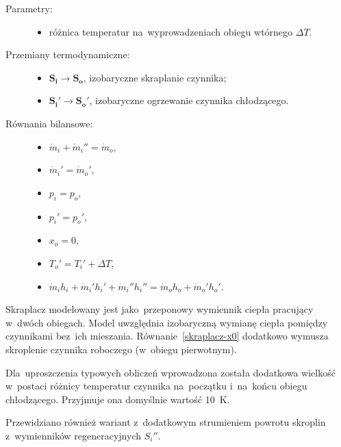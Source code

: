 \begin{description}

	\item[Parametry:] \hfill

		\begin{itemize}

			\item różnica temperatur na~wyprowadzeniach obiegu wtórnego
				$\Delta T$.

		\end{itemize}

	\item[Przemiany termodynamiczne:] \hfill

		\begin{itemize}

			\item $\mathbf{S_i} \rightarrow \mathbf{S_o}$,
				izobaryczne skraplanie czynnika;

			\item $\mathbf{S_i'} \rightarrow \mathbf{S_o'}$,
				izobaryczne ogrzewanie czynnika chłodzącego.

		\end{itemize}

	\item[Równania bilansowe:] \hfill

		\begin{itemize}

			\item \eq$\dot m_i + \dot m_i'' = \dot m_o$,

			\item \eq$\dot m_i' = \dot m_o'$,

			\item \eq$p_i = p_o$,

			\item \eq$p_i' = p_o'$,

			\item \eq$x_o = 0$,%
				\label{skraplacz-x0}

			\item \eq$T_o' = T_i' + \Delta T$,%
				\label{skraplacz-DT}

			\item \eq$\dot m_i h_i + \dot m_i' h_i' + \dot m_i'' h_i''
				= \dot m_o h_o + \dot m_o' h_o'$.

		\end{itemize}

\end{description}

Skraplacz modelowany jest jako~przeponowy wymiennik ciepła pracujący
w~dwóch obiegach. Model uwzględnia izobaryczną wymianę ciepła pomiędzy
czynnikami bez~ich mieszania. Równanie~\eqref{skraplacz-x0} dodatkowo
wymusza skroplenie czynnika roboczego (w~obiegu pierwotnym).

Dla~uproszczenia typowych obliczeń wprowadzona została dodatkowa
wielkość w~postaci różnicy temperatur czynnika na~początku i~na~końcu
obiegu chłodzącego. Przyjmuje ona domyślnie wartość \SI{10}{\kelvin}.

Przewidziano również wariant z~dodatkowym strumieniem powrotu skroplin
z~wymienników regeneracyjnych $S_i''$.
